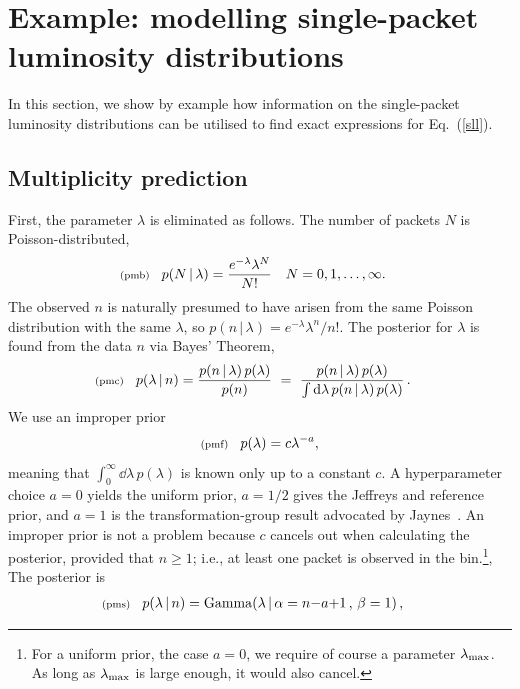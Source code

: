 \documentclass[11pt]{article}
\newcommand{\lleq}[1]{\label{#1} }
\renewcommand{\lleq}[1]{\label{#1} {\scriptstyle {\rm (#1)}} \hspace*{2ex} }
\newcommand{\cond}{\,|\,}
\DeclareMathOperator{\GammaDist}{Gamma}
\newcommand{\rmdx}[1]{\dd{#1}} %
\begin{document}
\section{Example: modelling single-packet luminosity distributions}
\label{sec:example}

In this section, we show by example how information on the
single-packet luminosity distributions can be utilised to find exact
expressions for Eq.~(\ref{sll}).

\subsection{Multiplicity prediction}

First, the parameter $\lambda$ is eliminated as follows. The number of
packets $N$ is Poisson-distributed,
\begin{align}
  \lleq{pmb}
  p(N\cond\lambda) &= \frac{e^{-\lambda}\lambda^{N}}{N!}
  \quad N = 0,1,\ldots,\infty.
\end{align}
The observed $n$ is naturally presumed to have arisen from the same Poisson
distribution with the same $\lambda$, so $p(n\cond\lambda) =
e^{-\lambda}\lambda^{n}/n!$. %
The posterior for $\lambda$ is found from the data $n$ via Bayes'
Theorem,
\begin{align}
  \lleq{pmc}
  p(\lambda\cond n) %
  &= \frac{p(n\cond\lambda)\,p(\lambda)} {p(n)}
  \ =\ \frac{p(n\cond\lambda)\,p(\lambda)} %
  {\int \rmdx{\lambda} p(n\cond\lambda)\,p(\lambda)} \,.
\end{align}
We use an improper prior
\begin{align}
  \lleq{pmf}
  p(\lambda) = c \lambda^{-a},
\end{align}
meaning that $\int_0^\infty \rmdx{\lambda}\,p(\lambda)$ is known only up to
a constant $c$. A hyperparameter choice $a=0$ yields the uniform
prior, $a=1/2$ gives the Jeffreys and reference prior, and $a=1$ is
the transformation-group result advocated by
Jaynes~\cite[Ch. 12]{jaynes2003probability}. An improper prior is not
a problem because $c$ cancels out when calculating the posterior,
provided that $n \ge 1$; i.e., at least one packet is observed in the
bin.\footnote{For a uniform prior, the case $a{=}0$, we require of
  course a parameter $\lambda_{\rm max}$. As long as
  $\lambda_{\rm max}$ is large enough, it would also cancel.}, The
posterior is
\begin{align}
  \lleq{pms}
  p(\lambda\cond n)
  &= \GammaDist(\lambda \cond \alpha = n{-}a{+}1 \,,\, \beta = 1)\,,
\end{align}
\end{document}

